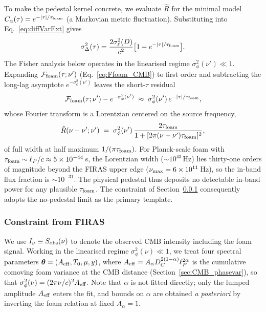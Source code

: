 \documentclass[aps,prd,onecolumn,amsmath,amssymb]{revtex4-2}
\begin{document}
To make the pedestal kernel concrete, we evaluate $\hat{R}$ for the
minimal model $C_\alpha(\tau)=e^{-|\tau|/\tau_{\rm foam}}$ (a Markovian
metric fluctuation).  Substituting into Eq.~\eqref{eq:diffVarExt} gives
\begin{equation}
  \sigma_\Delta^2(\tau) = \frac{2\sigma_\ell^2(D)}{c^2}
    \bigl[1 - e^{-|\tau|/\tau_{\rm foam}}\bigr].
  \label{eq:diffVarExt_exponential}
\end{equation}
The Fisher analysis below operates in the linearised regime
$\sigma_\phi^2(\nu')\ll 1$.  Expanding $\mathcal{F}_{\rm foam}(\tau;\nu')$
(Eq.~\eqref{eq:Ffoam_CMB}) to first order and subtracting the long-lag asymptote
$e^{-\sigma_\phi^2(\nu')}$ leaves the short-$\tau$ residual
\begin{equation}
  \mathcal{F}_{\rm foam}(\tau;\nu') - e^{-\sigma_\phi^2(\nu')}
  \;\approx\; \sigma_\phi^2(\nu')\,e^{-|\tau|/\tau_{\rm foam}},
  \label{eq:Ffoam_residual_exponential}
\end{equation}
whose Fourier transform is a Lorentzian centered on the source
frequency,
\begin{equation}
  \hat{R}(\nu-\nu';\nu')
    \;=\; \sigma_\phi^2(\nu')\,
    \frac{2\tau_{\rm foam}}{1 + [2\pi(\nu-\nu')\tau_{\rm foam}]^2},
  \label{eq:R_lorentzian}
\end{equation}
of full width at half maximum $1/(\pi\tau_{\rm foam})$.  For Planck-scale
foam with $\tau_{\rm foam}\sim\ell_P/c\approx 5\times 10^{-44}$\,s, the
Lorentzian width ($\sim 10^{43}$\,Hz) lies thirty-one orders of magnitude
beyond the FIRAS upper edge ($\nu_{\rm max}=6\times 10^{11}$\,Hz), so the
in-band flux fraction is $\sim 10^{-31}$.  The physical pedestal thus
deposits no detectable in-band power for any plausible $\tau_{\rm foam}$.  The
constraint of Section~\ref{sec:CMB_degeneracy} consequently
adopts the no-pedestal limit as the primary template.

\subsubsection{Constraint from FIRAS}
\label{sec:CMB_degeneracy}

We use $I_\nu\equiv S_{\rm obs}(\nu)$ to denote the observed CMB
intensity including the foam signal.
Working in the linearised regime
$\sigma_\phi^2(\nu)\ll 1$, we treat four spectral parameters
$\boldsymbol{\theta}=(A_{\rm eff},T_0,\mu,y)$, where
$A_{\rm eff}=A_\alpha D_C^{2(1-\alpha)}\ell_P^{2\alpha}$
is the cumulative comoving foam variance at the CMB distance
(Section~\ref{sec:CMB_phasevar}), so that
$\sigma_\phi^2(\nu)=(2\pi\nu/c)^2 A_{\rm eff}$.  Note that $\alpha$ is
not fitted directly; only the lumped amplitude $A_{\rm eff}$ enters
the fit, and bounds on $\alpha$ are obtained
\emph{a posteriori} by inverting the foam relation at fixed
$A_\alpha=1$.
\end{document}
